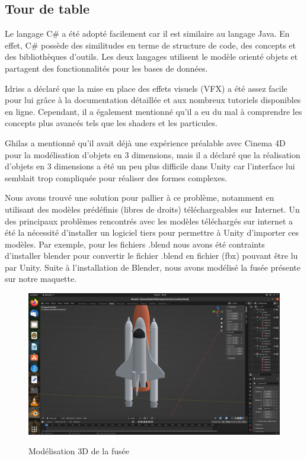 \documentclass[a4paper, 12pt]{article}
\begin{document}
\subsection{Tour de table}

Le langage C\# a été adopté facilement car il est similaire au langage Java. En effet, C\# possède des similitudes en terme de structure de code, des concepts et des bibliothèques d'outils. Les deux langages utilisent le modèle orienté objets et partagent des fonctionnalités pour les bases de données.

Idriss a déclaré que la mise en place des effets visuels (VFX) a été assez facile pour lui grâce à la documentation détaillée et aux nombreux tutoriels disponibles en ligne. Cependant, il a également mentionné qu'il a eu du mal à comprendre les concepts plus avancés tels que les shaders et les particules.

Ghilas a mentionné qu'il avait déjà une expérience préalable avec Cinema 4D pour la modélisation d'objets en 3 dimensions, mais il a déclaré que la réalisation d'objets en 3 dimensions a été un peu plus difficile dans Unity car l'interface lui semblait trop compliquée pour réaliser des formes complexes.

Nous avons trouvé une solution pour pallier à ce problème, notamment en utilisant des modèles prédéfinis (libres de droits) téléchargeables sur Internet.
Un des principaux problèmes rencontrés avec les modèles téléchargés sur internet a été la nécessité d'installer un logiciel tiers pour permettre à Unity d'importer ces modèles. Par exemple, pour les fichiers .blend nous avons été contraints d'installer blender pour convertir le fichier .blend en fichier (fbx) pouvant être lu par Unity. 
Suite à l'installation de Blender, nous avons modélisé la fusée présente sur notre maquette. 

 \begin{figure}[!h]
    \centering
    \includegraphics[scale=0.2]{fuseeBlender.png}
    \label{fig:Le_planning}
    \caption{Modélisation 3D de la fusée}
\end{figure}
\end{document}

